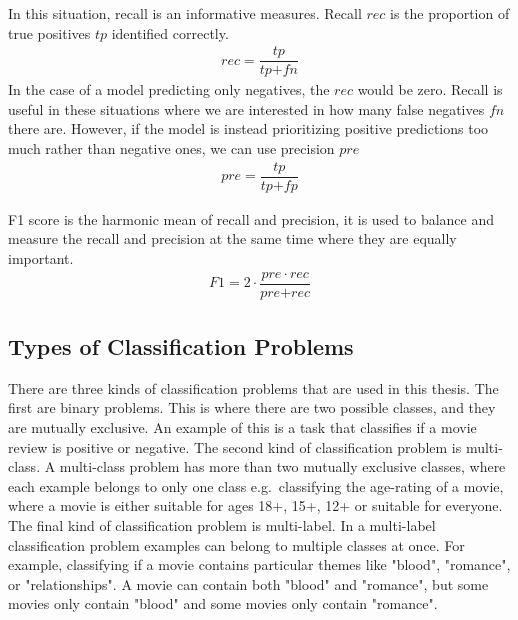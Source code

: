 In this situation,  recall is an informative measures. Recall $\textit{rec}$ is the proportion of true positives $\textit{tp}$ identified correctly. 
\begin{align}
\textit{rec} = \dfrac{\textit{tp}}{\textit{tp} + \textit{fn}}
\end{align}
In the case of a model predicting only negatives, the $\textit{rec}$ would be zero. Recall is useful in these situations where we are interested in how many false negatives ${fn}$ there are. However, if the model is instead prioritizing positive predictions too much rather than negative ones, we can use precision ${pre}$
\begin{align}
\textit{pre} = \dfrac{\textit{tp}} {\textit{tp} + \textit{fp}}
\end{align}

F1 score is the harmonic mean of recall and precision, it is used to balance and measure the recall and precision at the same time where they are equally important. 
\begin{align}
{F1} = 2 \cdot \dfrac{\textit{pre} \cdot {rec}}{\textit{pre} + \textit{rec}}
\end{align}

\subsection{Types of Classification Problems}\label{bg:multi-label}


There are three kinds of classification problems that are used in this thesis. The first are binary problems. This is where there are two possible classes, and they are mutually exclusive. An example of this is a task that classifies if a movie review is positive or negative. The second kind of classification problem is multi-class. A multi-class problem has more than two mutually exclusive classes, where each example belongs to only one class e.g.\ classifying the age-rating of a movie, where a movie is either suitable for ages 18+, 15+, 12+ or suitable for everyone. The final kind of classification problem is multi-label. In a multi-label classification problem examples can belong to multiple classes at once. For example, classifying if a movie contains particular themes like "blood", "romance", or "relationships". A movie can contain both "blood" and "romance", but some movies only contain "blood" and some movies only contain "romance". 

